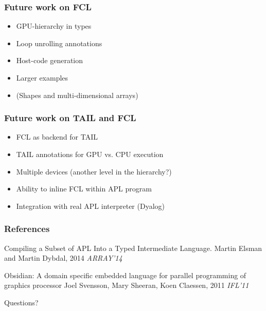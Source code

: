 \documentclass{beamer}
\begin{document}
\begin{frame}
  \frametitle{Future work on FCL}
  \begin{itemize}
  \item GPU-hierarchy in types
  \item Loop unrolling annotations
  \item Host-code generation
  \item Larger examples
  \item (Shapes and multi-dimensional arrays)
  \end{itemize}
\end{frame}


\begin{frame}
  \frametitle{Future work on TAIL and FCL}
  \begin{itemize}
  \item FCL as backend for TAIL
  \item TAIL annotations for GPU vs. CPU execution
  \item Multiple devices (another level in the hierarchy?)
  \item Ability to inline FCL within APL program
  \item Integration with real APL interpreter (Dyalog)
  \end{itemize}
\end{frame}

\begin{frame}
\frametitle{References}
\footnotesize{
\begin{thebibliography}{99} %
 Compiling a Subset of APL Into a Typed Intermediate Language.
\newblock Martin Elsman and Martin Dybdal, 2014
\newblock \emph{ARRAY'14}

 Obsidian: A domain specific embedded language for parallel programming of graphics processor
\newblock Joel Svensson, Mary Sheeran, Koen Claessen, 2011
\newblock \emph{IFL'11}

\end{thebibliography}
}
\end{frame}

\begin{frame}
\Huge{\centerline{Questions?}}
\end{frame}


\end{document}
